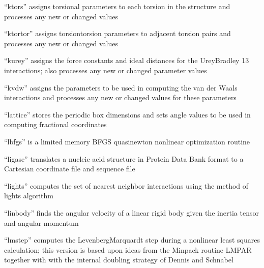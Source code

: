 \documentclass[letterpaper,11pt,english]{sphinxmanual}
\begin{document}

“ktors” assigns torsional parameters to each torsion in the structure and processes any new or changed values


“ktortor” assigns torsion\sphinxhyphen{}torsion parameters to adjacent torsion pairs and processes any new or changed values


“kurey” assigns the force constants and ideal distances for the Urey\sphinxhyphen{}Bradley 1\sphinxhyphen{}3 interactions; also processes any new or changed parameter values


“kvdw” assigns the parameters to be used in computing the van der Waals interactions and processes any new or changed values for these parameters


“lattice” stores the periodic box dimensions and sets angle values to be used in computing fractional coordinates


“lbfgs” is a limited memory BFGS quasi\sphinxhyphen{}newton nonlinear optimization routine


“ligase” translates a nucleic acid structure in Protein Data Bank format to a Cartesian coordinate file and sequence file


“lights” computes the set of nearest neighbor interactions using the method of lights algorithm


“linbody” finds the angular velocity of a linear rigid body given the inertia tensor and angular momentum


“lmstep” computes the Levenberg\sphinxhyphen{}Marquardt step during a nonlinear least squares calculation; this version is based upon ideas from the Minpack routine LMPAR together with with the internal doubling strategy of Dennis and Schnabel

\end{document}
